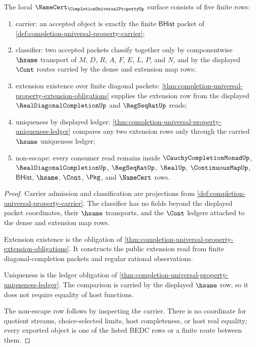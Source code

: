 \begin{theorem}
\label{thm:completion-universal-property-namecert-obligations}
The local $\NameCert_{\CompletionUniversalPropertyUp}$ surface consists of five finite rows:
\begin{enumerate}
\item carrier: an accepted object is exactly the finite $\mathsf{BHist}$ packet of \autoref{def:completion-universal-property-carrier};
\item classifier: two accepted packets classify together only by componentwise $\hsame$ transport of $M$, $D$, $R$, $A$, $F$, $E$, $L$, $P$, and $N$, and by the displayed $\Cont$ routes carried by the dense and extension map rows;
\item extension existence over finite diagonal packets: \autoref{thm:completion-universal-property-extension-obligations} supplies the extension row from the displayed $\RealDiagonalCompletionUp$ and $\RegSeqRatUp$ reads;
\item uniqueness by displayed ledger: \autoref{thm:completion-universal-property-uniqueness-ledger} compares any two extension rows only through the carried $\hsame$ uniqueness ledger;
\item non-escape: every consumer read remains inside $\CauchyCompletionMonadUp$, $\RealDiagonalCompletionUp$, $\RegSeqRatUp$, $\RealUp$, $\ContinuousMapUp$, $\mathsf{BHist}$, $\hsame$, $\Cont$, $\Pkg$, and $\NameCert$ rows.
\end{enumerate}
\end{theorem}
\begin{proof}
Carrier admission and classification are projections from \autoref{def:completion-universal-property-carrier}. The classifier has no fields beyond the displayed packet coordinates, their $\hsame$ transports, and the $\Cont$ ledgers attached to the dense and extension map rows.

Extension existence is the obligation of \autoref{thm:completion-universal-property-extension-obligations}. It constructs the public extension read from finite diagonal-completion packets and regular rational observations.

Uniqueness is the ledger obligation of \autoref{thm:completion-universal-property-uniqueness-ledger}. The comparison is carried by the displayed $\hsame$ row, so it does not require equality of host functions.

The non-escape row follows by inspecting the carrier. There is no coordinate for quotient streams, choice-selected limits, host completeness, or host real equality; every exported object is one of the listed BEDC rows or a finite route between them.
\end{proof}

